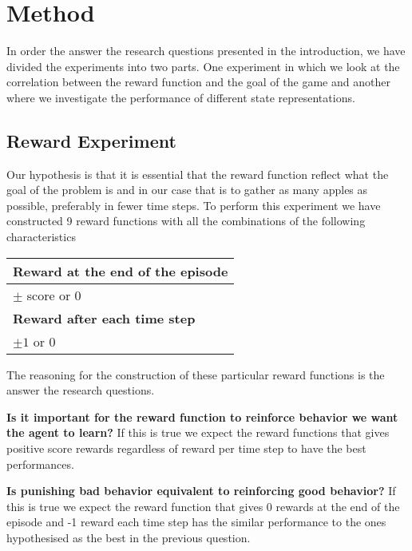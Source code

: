 \documentclass[report.tex]{subfiles}
\begin{document}
    \section*{\centering Method}

    In order the answer the research questions presented in the introduction, we have divided the experiments into two parts. One experiment in which we look at the correlation between the reward function and the goal of the game and another where we investigate the performance of different state representations.

    \subsection*{Reward Experiment}

    Our hypothesis is that it is essential that the reward function reflect what the goal of the problem is and in our case that is to gather as many apples as possible, preferably in fewer time steps. To perform this experiment we have constructed 9 reward functions with all the combinations of the following characteristics

    \begin{center}
        \begin{tabular}{| l |}
            \hline
            \textbf{Reward at the end of the episode} \\ \hline
            $\pm$ score or 0 \\ \hline
            \textbf{Reward after each time step} \\ \hline
            $\pm 1$ or 0 \\ \hline
        \end{tabular}
    \end{center}

    The reasoning for the construction of these particular reward functions is the answer the research questions.

    \textbf{Is it important for the reward function to reinforce behavior we want the agent to learn?} If this is true we expect the reward functions that gives positive score rewards regardless of reward per time step to have the best performances.

    \textbf{Is punishing bad behavior equivalent to reinforcing good behavior?} If this is true we expect the reward function that gives 0 rewards at the end of the episode and -1 reward each time step has the similar performance to the ones hypothesised as the best in the previous question.
\end{document}

